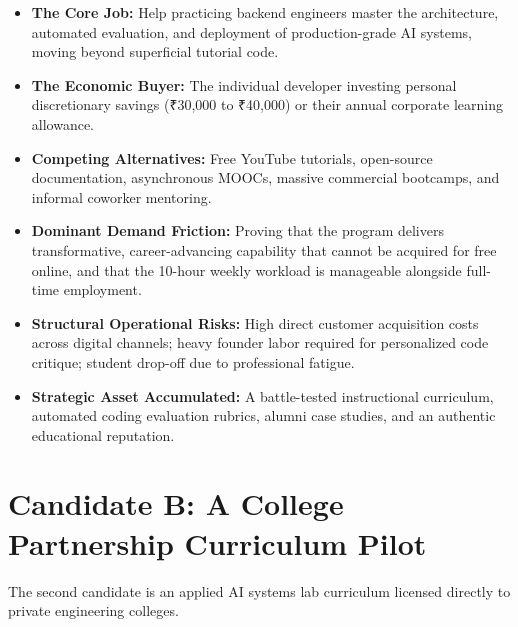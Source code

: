 \begin{itemize}[leftmargin=12pt,itemsep=1pt,topsep=1pt]
  \item \textbf{The Core Job:} Help practicing backend engineers master the architecture, automated evaluation, and deployment of production-grade AI systems, moving beyond superficial tutorial code.
  \item \textbf{The Economic Buyer:} The individual developer investing personal discretionary savings (₹30,000 to ₹40,000) or their annual corporate learning allowance.
  \item \textbf{Competing Alternatives:} Free YouTube tutorials, open-source documentation, asynchronous MOOCs, massive commercial bootcamps, and informal coworker mentoring.
  \item \textbf{Dominant Demand Friction:} Proving that the program delivers transformative, career-advancing capability that cannot be acquired for free online, and that the 10-hour weekly workload is manageable alongside full-time employment.
  \item \textbf{Structural Operational Risks:} High direct customer acquisition costs across digital channels; heavy founder labor required for personalized code critique; student drop-off due to professional fatigue.
  \item \textbf{Strategic Asset Accumulated:} A battle-tested instructional curriculum, automated coding evaluation rubrics, alumni case studies, and an authentic educational reputation.
\end{itemize}

\section{Candidate B: A College Partnership Curriculum Pilot}

The second candidate is an applied AI systems lab curriculum licensed directly to private engineering colleges.

